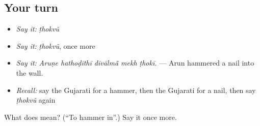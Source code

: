 \subsection*{Your turn}
\begin{itemize}
\raggedright
  \item \emph{Say it:} \emph{ṭhokvũ}
  \item \emph{Say it:} \emph{ṭhokvũ}, once more
  \item \emph{Say it:} \emph{Aruṇe hathoḍīthī dīvālmā̃ mekh ṭhokī.} — Arun hammered a nail into the wall.
  \item \emph{Recall:} say the Gujarati for a hammer, then the Gujarati for a nail, then say \emph{ṭhokvũ} again
\end{itemize}

\begin{tcolorbox}[breakable,colback=teal!4,colframe=teal!35!black,title={Before you move on}]
What does  mean? (\textquotedblleft{}To hammer in\textquotedblright{}.) Say it once more.
\end{tcolorbox}
